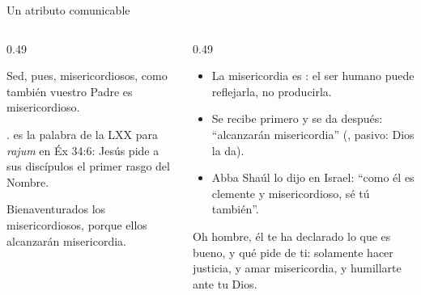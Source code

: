 \begin{frame}{Un atributo comunicable}
\begin{columns}[t,onlytextwidth]
\begin{column}{0.49\textwidth}
\begin{cita}Sed, pues, misericordiosos, como también vuestro Padre es misericordioso.\end{cita}
\scriptsize{}.  es la palabra de la LXX para \emph{rajum} en Éx 34:6: Jesús pide a sus discípulos el primer rasgo del Nombre.
\begin{cita}Bienaventurados los misericordiosos, porque ellos alcanzarán misericordia.\end{cita}
\end{column}
\begin{column}{0.49\textwidth}\small
\begin{itemize}
\item La misericordia es : el ser humano puede reflejarla, no producirla.
\item Se recibe primero y se da después: ``alcanzarán misericordia'' (, pasivo: Dios la da).
\item Abba Shaúl lo dijo en Israel: ``como él es clemente y misericordioso, sé tú también''.
\end{itemize}
\begin{cita}Oh hombre, él te ha declarado lo que es bueno, y qué pide \SENOR{} de ti: solamente hacer justicia, y amar misericordia, y humillarte ante tu Dios.\end{cita}
\end{column}
\end{columns}
\end{frame}

